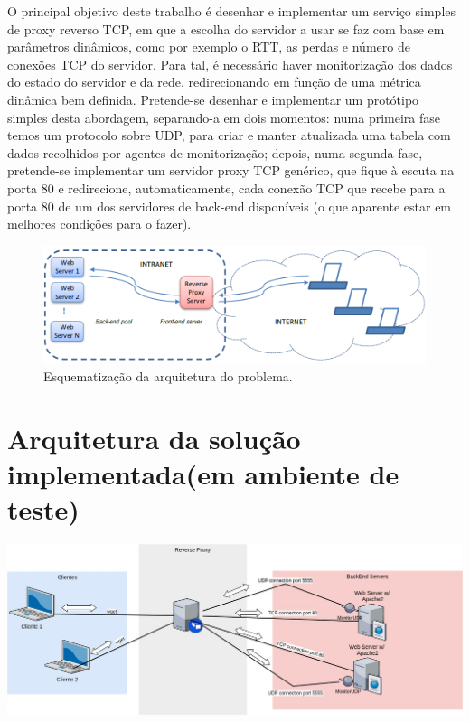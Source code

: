 \documentclass{llncs}
\begin{document}
O principal objetivo deste trabalho é desenhar e implementar um serviço simples de proxy reverso TCP, em que a escolha do servidor a usar se
faz com base em parâmetros dinâmicos, como por exemplo o RTT, as perdas e número de conexões TCP do servidor. Para tal, é necessário haver monitorização dos dados do estado do servidor e da rede, redirecionando em função de uma métrica dinâmica bem definida. Pretende-se desenhar e implementar um protótipo simples desta abordagem, separando-a em dois momentos: numa primeira fase temos um protocolo sobre UDP, para criar e manter atualizada uma tabela com dados recolhidos por agentes de monitorização; depois, numa segunda fase, pretende-se implementar um servidor proxy TCP genérico, que fique à escuta na porta 80 e redirecione, automaticamente, cada conexão TCP que recebe para a porta 80 de um dos servidores de back-end disponíveis (o que aparente estar em melhores condições para o fazer).

\begin{figure}[H]
\centering
\includegraphics[width=150mm, scale=0.5]{imagem_enunciado.PNG}
\caption{\label{fig:change}Esquematização da arquitetura do problema.}
\end{figure}

\newpage

\section{Arquitetura da solução implementada(em ambiente de teste)}
\includegraphics[width=160mm, scale=1]{imagemArq.jpg}

\newpage
\end{document}
